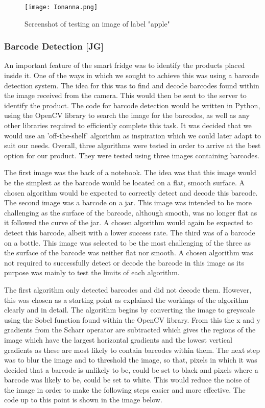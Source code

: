 \begin{figure}[H]        
    \centering
    \texttt{[image: Ionanna.png]}
    \caption{Screenshot of testing an image of label "apple"}
\end{figure} 

\subsubsection{Barcode Detection [JG]}

An important feature of the smart fridge was to identify the products placed inside it.
One of the ways in which we sought to achieve this was using a barcode detection system.
The idea for this was to find and decode barcodes found within the image received from the camera.
This would then be sent to the server to identify the product.
The code for barcode detection would be written in Python, using the OpenCV library to search the image for the barcodes, as well as any other libraries required to efficiently complete this task.
It was decided that we would use an 'off-the-shelf' algorithm as inspiration which we could later adapt to suit our needs.
Overall, three algorithms were tested in order to arrive at the best option for our product.
They were tested using three images containing barcodes.

The first image was the back of a notebook.
The idea was that this image would be the simplest as the barcode would be located on a flat, smooth surface.
A chosen algorithm would be expected to correctly detect and decode this barcode.
The second image was a barcode on a jar.
This image was intended to be more challenging as the surface of the barcode, although smooth, was no longer flat as it followed the curve of the jar.
A chosen algorithm would again be expected to detect this barcode, albeit with a lower success rate.
The third was of a barcode on a bottle.
This image was selected to be the most challenging of the three as the surface of the barcode was neither flat nor smooth.
A chosen algorithm was not required to successfully detect or decode the barcode in this image as its purpose was mainly to test the limits of each algorithm.

The first algorithm \cite{rosebrock_2021} only detected barcodes and did not decode them.
However, this was chosen as a starting point as \cite{rockikz_2020} explained the workings of the algorithm clearly and in detail.
The algorithm begins by converting the image to greyscale using the Sobel function found within the OpenCV library.
From this the x and y gradients from the Scharr operator are subtracted which gives the regions of the image which have the largest horizontal gradients and the lowest vertical gradients as these are most likely to contain barcodes within them.
The next step was to blur the image and to threshold the image, so that, pixels in which it was decided that a barcode is unlikely to be, could be set to black and pixels where a barcode was likely to be, could be set to white.
This would reduce the noise of the image in order to make the following steps easier and more effective.
The code up to this point is shown in the image below.

